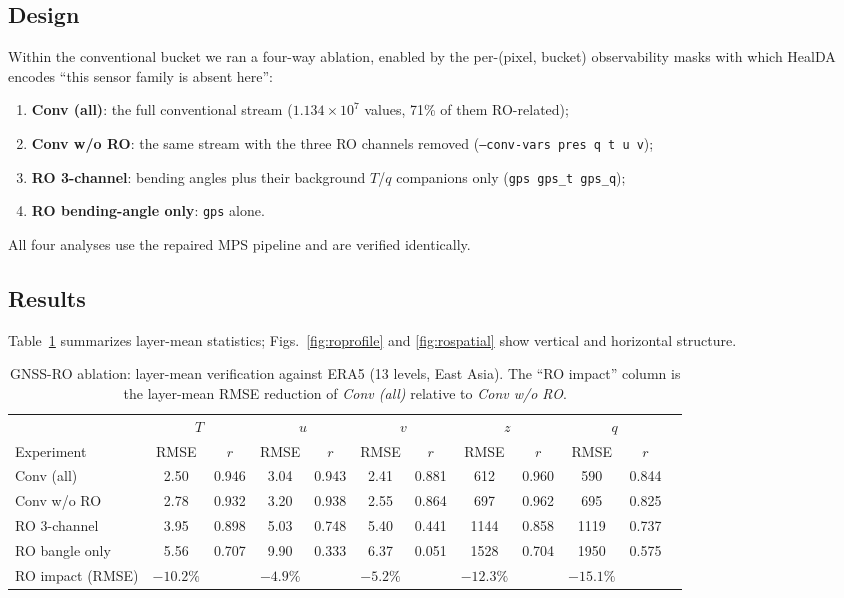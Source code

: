 \documentclass[twocolumn,11pt]{article}
\begin{document}
\subsection{Design}
Within the conventional bucket we ran a four-way ablation, enabled by
the per-(pixel, bucket) observability masks with which HealDA encodes
``this sensor family is absent here'':
\begin{enumerate}
\item \textbf{Conv (all)}: the full conventional stream
($1.134\times10^{7}$ values, 71\% of them RO-related);
\item \textbf{Conv w/o RO}: the same stream with the three RO
channels removed (\texttt{--conv-vars pres q t u v});
\item \textbf{RO 3-channel}: bending angles plus their background
$T$/$q$ companions only (\texttt{gps gps\_t gps\_q});
\item \textbf{RO bending-angle only}: \texttt{gps} alone.
\end{enumerate}
All four analyses use the repaired MPS pipeline and are verified
identically.

\subsection{Results}
Table~\ref{tab:ro} summarizes layer-mean statistics;
Figs.~\ref{fig:roprofile} and \ref{fig:rospatial} show vertical and
horizontal structure.

\begin{table}[t]
\centering
\caption{GNSS-RO ablation: layer-mean verification against ERA5 (13
levels, East Asia). The ``RO impact'' column is the layer-mean RMSE
reduction of \emph{Conv (all)} relative to \emph{Conv w/o RO}.}
\label{tab:ro}
\footnotesize
\setlength{\tabcolsep}{5pt}
\begin{tabular}{@{}l cc cc cc cc cc c@{}}
\toprule
 & \multicolumn{2}{c}{$T$} & \multicolumn{2}{c}{$u$} &
   \multicolumn{2}{c}{$v$} & \multicolumn{2}{c}{$z$} &
   \multicolumn{2}{c}{$q$} \\
\cmidrule(lr){2-3}\cmidrule(lr){4-5}\cmidrule(lr){6-7}\cmidrule(lr){8-9}\cmidrule(lr){10-11}
Experiment & RMSE & $r$ & RMSE & $r$ & RMSE & $r$ & RMSE & $r$ & RMSE & $r$ \\
\midrule
Conv (all)      & 2.50 & 0.946 & 3.04 & 0.943 & 2.41 & 0.881 & 612 & 0.960 & 590 & 0.844 \\
Conv w/o RO     & 2.78 & 0.932 & 3.20 & 0.938 & 2.55 & 0.864 & 697 & 0.962 & 695 & 0.825 \\
RO 3-channel    & 3.95 & 0.898 & 5.03 & 0.748 & 5.40 & 0.441 & 1144 & 0.858 & 1119 & 0.737 \\
RO bangle only  & 5.56 & 0.707 & 9.90 & 0.333 & 6.37 & 0.051 & 1528 & 0.704 & 1950 & 0.575 \\
\midrule
RO impact (RMSE) & $-10.2\%$ & & $-4.9\%$ & & $-5.2\%$ & & $-12.3\%$ & & $-15.1\%$ & \\
\bottomrule
\end{tabular}
\end{table}
\end{document}

